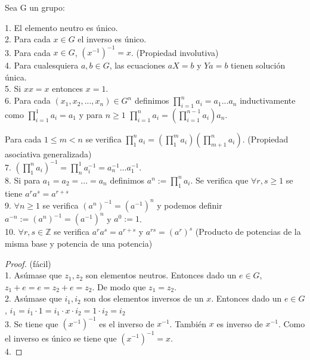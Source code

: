 \begin{nprop}
Sea G un grupo:

1. El elemento neutro es único. \\
2. Para cada $x \in G$ el inverso es único. \\
3. Para cada $x \in G$, $(x^{-1})^{-1} = x$. (Propiedad involutiva) \\
4. Para cualesquiera $a,b \in G$, las ecuaciones $aX = b$ y $Ya = b$ tienen solución única. \\
5. Si $xx = x$ entonces $x=1$. \\
6. Para cada $(x_1,x_2,...,x_n) \in G^{n}$ definimos $\prod_{i=1}^{n} a_i = a_1...a_n$ inductivamente como $\prod_{i=1}^{1} a_i = a_1$ y para $n \geq 1$ $\prod_{i=1}^{n} a_i = (\prod_{i=1}^{n-1} a_i)a_n$.

Para cada $1 \leq m < n$ se verifica $\prod_{1}^{n} a_i = (\prod_{1}^{m} a_i)(\prod_{m+1}^{n} a_i)$. (Propiedad asociativa generalizada)\\
7. $(\prod_{1}^n a_i)^{-1} = \prod_{n}^{1} a_i^{-1} = a_n^{-1}...a_1^{-1}$. \\
8. Si para $a_1 = a_2 = ... = a_n$ definimos $a^n := \prod_{1}^{n} a_i$. Se verifica que $\forall r,s \ge 1$ se tiene $a^ra^s= a^{r+s}$  \\
9. $\forall n \ge 1$ se verifica $(a^n)^{-1} = (a^{-1})^n$ y podemos definir $a^{-n} := (a^n)^{-1} = (a^{-1})^n$ y $a^0 := 1$. \\
10. $\forall r,s \in \mathbb{Z}$ se verifica $a^ra^s = a^{r+s}$ y $a^{rs} = (a^r)^s$ (Producto de potencias de la misma base y potencia de una potencia)
\end{nprop}
\begin{proof}
(fácil) \\
1. Asúmase que $z_1,z_2$ son elementos neutros. Entonces dado un $e \in G$, $z_1 + e = e = z_2 + e = z_2$. De modo que $z_1 = z_2$. \\
2. Asúmase que $i_1,i_2$ son dos elementos inversos de un $x$. Entonces dado un $e \in G$, $i_1 = i_1 \cdot 1 = i_1 \cdot x \cdot i_2 = 1 \cdot i_2 = i_2$ \\
3. Se tiene que $(x^{-1})^{-1}$ es el inverso de $x^{-1}$. También $x$ es inverso de $x^{-1}$. Como el inverso es único se tiene que $(x^{-1})^{-1} = x$. \\
4.
\end{proof}

